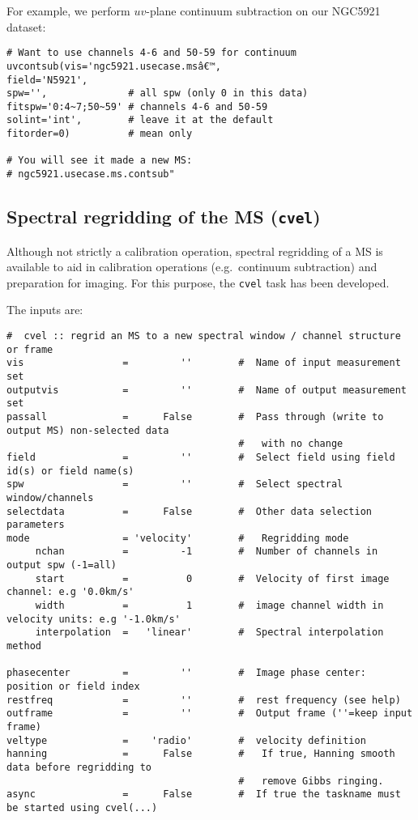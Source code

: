 For example, we perform $uv$-plane continuum subtraction on our NGC5921
dataset:
\small
\begin{verbatim}
# Want to use channels 4-6 and 50-59 for continuum
uvcontsub(vis='ngc5921.usecase.msâ€™,
field='N5921',
spw='',              # all spw (only 0 in this data)
fitspw='0:4~7;50~59' # channels 4-6 and 50-59
solint='int',        # leave it at the default
fitorder=0)          # mean only

# You will see it made a new MS:
# ngc5921.usecase.ms.contsub"
\end{verbatim}
\normalsize

\subsection{Spectral regridding of the MS ({\tt cvel})}
\label{section:cal.other.cvel}

Although not strictly a calibration operation, spectral regridding
of a MS is available to aid in calibration operations (e.g.\ continuum
subtraction) and preparation for imaging.  For this purpose, the
{\tt cvel} task has been developed.  

The inputs are:
\small
\begin{verbatim}
#  cvel :: regrid an MS to a new spectral window / channel structure or frame
vis                 =         ''        #  Name of input measurement set
outputvis           =         ''        #  Name of output measurement set
passall             =      False        #  Pass through (write to output MS) non-selected data
                                        #   with no change
field               =         ''        #  Select field using field id(s) or field name(s)
spw                 =         ''        #  Select spectral window/channels
selectdata          =      False        #  Other data selection parameters
mode                = 'velocity'        #   Regridding mode
     nchan          =         -1        #  Number of channels in output spw (-1=all)
     start          =          0        #  Velocity of first image channel: e.g '0.0km/s'
     width          =          1        #  image channel width in velocity units: e.g '-1.0km/s'
     interpolation  =   'linear'        #  Spectral interpolation method

phasecenter         =         ''        #  Image phase center: position or field index
restfreq            =         ''        #  rest frequency (see help)
outframe            =         ''        #  Output frame (''=keep input frame)
veltype             =    'radio'        #  velocity definition
hanning             =      False        #   If true, Hanning smooth data before regridding to
                                        #   remove Gibbs ringing.
async               =      False        #  If true the taskname must be started using cvel(...)

\end{verbatim}
\normalsize

